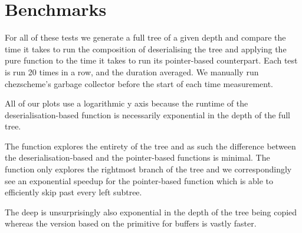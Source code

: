 


\section{Benchmarks}\label{sec:timing}

For all of these tests we generate a full tree of a given depth and
compare the time it takes to run the composition of deserialising
the tree and applying the pure function to the time it takes to run
its pointer-based counterpart.
%
Each test is run 20 times in a row, and the duration averaged.
%
We manually run chezscheme's garbage collector before the start of
each time measurement.

All of our plots use a logarithmic y axis because the runtime of the
deserialisation-based function is necessarily exponential in the depth
of the full tree.

The  function explores the entirety of the tree
and as such the difference between the deserialisation-based and the
pointer-based functions is minimal.
%
The  function only explores the rightmost
branch of the tree and we correspondingly see an exponential speedup
for the pointer-based function which is able to efficiently skip past
every left subtree.

\begin{center}
\begin{minipage}{.45\textwidth}
\end{minipage}\qquad
\begin{minipage}{.45\textwidth}
\end{minipage}
\end{center}

The deep  is unsurprisingly also exponential in
the depth of the tree being copied whereas the version based on the
 primitive for buffers is vastly faster.

\begin{center}
\begin{minipage}{.45\textwidth}
\end{minipage}
\end{center}
